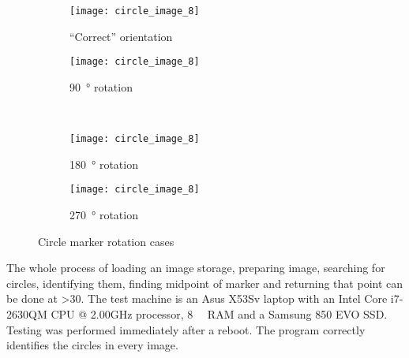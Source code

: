 \begin{figure}[ht]
\centering
\begin{subfigure}[b]{0.45\linewidth}
\centering
    \texttt{[image: circle\_image\_8]}
    \caption{``Correct'' orientation}
\label{fig:marker_rotation_1}
\end{subfigure}
\begin{subfigure}[b]{0.45\linewidth}
\centering
    \texttt{[image: circle\_image\_8]}
    \caption{\SI{90}{\degree} rotation}
\label{fig:marker_rotation_2}
\end{subfigure}\\
\begin{subfigure}[b]{0.45\linewidth}
\centering
    \texttt{[image: circle\_image\_8]}
    \caption{\SI{180}{\degree} rotation}
\label{fig:marker_rotation_3}
\end{subfigure}
\begin{subfigure}[b]{0.45\linewidth}
\centering
    \texttt{[image: circle\_image\_8]}
    \caption{\SI{270}{\degree} rotation}
\label{fig:marker_rotation_4}
\end{subfigure}
\caption{Circle marker rotation cases}
\label{fig:marker_rotation}
\end{figure}

The whole process of loading an image storage, preparing image, searching for circles, identifying them,
finding midpoint of marker and returning that point can be done at \SI{>30}{\fps}.
The test machine is an Asus X53Sv laptop with an Intel Core i7-2630QM CPU @ 2.00GHz processor, \SI{8}{\giga\byte} RAM and a Samsung 850 EVO SSD.\@
Testing was performed immediately after a reboot.
The program correctly identifies the circles in every image.
